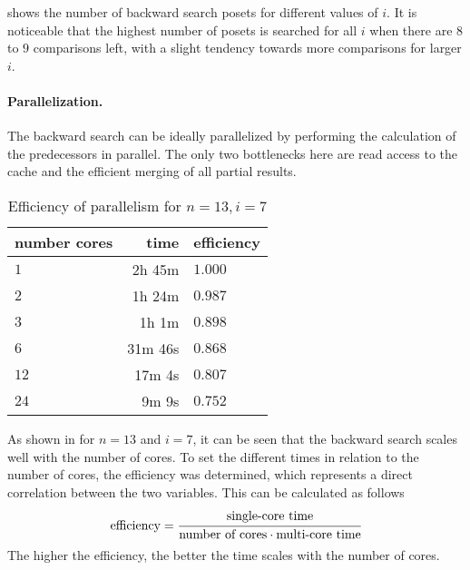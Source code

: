 \documentclass[twoside,leqno,twocolumn]{article}
\begin{document}
 shows the number of backward search posets for different values of $i$.
It is noticeable that the highest number of posets is searched for all $i$ when there are $8$ to $9$ comparisons left, with a slight tendency towards more comparisons for larger $i$.


\paragraph{Parallelization.} \label{sec:backward:parallelisation}

The backward search can be ideally parallelized by performing the calculation of the predecessors in parallel.
The only two bottlenecks here are read access to the cache and the efficient merging of all partial results.

\begin{table}[!t]
  \renewcommand{\arraystretch}{1.2}
  \caption{Efficiency of parallelism for $n = 13, i = 7$}
  \label{table:backward-parallel}
  \centering
  \begin{tabular}{l|r|l}
    \textbf{number cores} & \textbf{time} & \textbf{efficiency} \\
    \hline
    $1$                   & 2h 45m        & $1.000$             \\
    $2$                   & 1h 24m        & $0.987$             \\ %
    $3$                   & 1h 1m         & $0.898$             \\
    $6$                   & 31m 46s       & $0.868$             \\
    $12$                  & 17m 4s        & $0.807$             \\
    $24$                  & 9m 9s         & $0.752$             \\
  \end{tabular}
\end{table}

As shown in  for $n = 13$ and $i = 7$, it can be seen that the backward search scales well with the number of cores.
To set the different times in relation to the number of cores, the efficiency was determined, which represents a direct correlation between the two variables.
This can be calculated as follows
\[
  \text{efficiency} = \cfrac{\text{single-core time}}{\text{number of cores} \cdot \text{multi-core time}}
\]
The higher the efficiency, the better the time scales with the number of cores.
\end{document}
